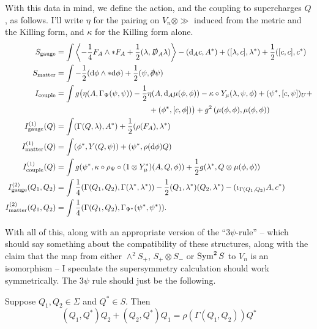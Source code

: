 \documentclass[10pt, oneside]{article}
\begin{document}
With this data in mind, we define the action, and the coupling to supercharges $Q$, as follows.  I'll write $\eta$ for the pairing on $V_n \otimes \gg$ induced from the metric and the Killing form, and $\kappa$ for the Killing form alone.
\begin{align*}
S_{\mr{gauge}} &= \int \left\langle -\frac{1}{4} F_A \wedge \ast F_A + \frac{1}{2}(\lambda, \sd D_A \lambda)\right\rangle - (\d_A c, A^*) + ([\lambda, c], \lambda^*) + \frac{1}{2}([c, c], c^*)\\
S_{\mr{matter}} &= \int - \frac{1}{2}  (\d \phi \wedge * \d \phi) + \frac{1}{2} (\psi , \sd \dd \psi)\\
I_{\mr{couple}} &= \int g\big( \eta(A, \Gamma_\Psi(\psi, \psi)) - \frac 12 \eta(A, \d_A \mu( \phi, \phi)) - 
\kappa \circ Y_\mu(\lambda,\psi,\phi)  +  (\psi^*, [c, \psi])_U + \\
&\qquad\qquad\qquad\qquad\qquad\qquad +  (\phi^*, [c, \phi])\big)  +  g^2 \left(\mu(\phi, \phi), \mu(\phi, \phi) \right) \\
I^{(1)}_{\mr{gauge}}(Q) &= \int (\Gamma(Q, \lambda), A^*) + \frac{1}{2}(\rho(F_A), \lambda^*) \\
I^{(1)}_{\mr{matter}}(Q) &= \int (\phi^*, Y(Q, \psi)) + (\psi^*, \rho(\d \phi) Q)\\
I^{(1)}_{\mr{couple}}(Q) &= \int g (\psi^*, \kappa \circ \rho_\Psi \circ (1 \otimes Y_\mu^*)(A, Q, \phi)) + \frac{1}{2} g (\lambda^*, Q \otimes \mu(\phi,\phi)) \\
I^{(2)}_{\mr{gauge}}(Q_1,Q_2) &= \int \frac{1}{4}(\Gamma(Q_1, Q_2), \Gamma(\lambda^*, \lambda^*)) - \frac{1}{2}(Q_1, \lambda^*)(Q_2, \lambda^*) - (\iota_{\Gamma(Q_1, Q_2)} A, c^*) \\
I^{(2)}_{\mr{matter}}(Q_1,Q_2) &= \int \frac{1}{4}(\Gamma(Q_1, Q_2) , \Gamma_{\Psi^*}(\psi^*, \psi^*)).
\end{align*}

With all of this, along with an appropriate version of the ``$3\psi$-rule'' -- which should say something about the compatibility of these structures, along with the claim that the map from either $\wedge^2S_+$, $S_+ \otimes S_-$ or $\operatorname{Sym}^2 S$ to $V_n$ is an isomorphism -- I speculate the supersymmetry calculation should work symmetrically.  The $3\psi$ rule should just be the following.

\begin{prop}\label{prop: new3psi}
Suppose $Q_1,Q_2 \in \Sigma$ and $Q^* \in S$. 
Then
\[
(Q_1, Q^*) Q_2 + (Q_2, Q^*)Q_1 = \rho(\Gamma(Q_1,Q_2)) Q^*
\]
\end{prop}
\end{document}
